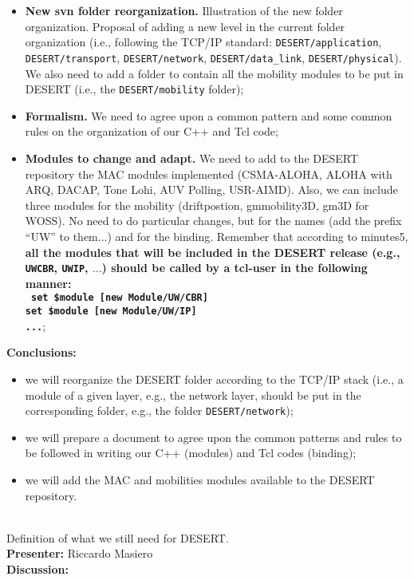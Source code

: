 \documentclass[11pt,journal,draftclsnofoot,onecolumn,twoside,letterpaper]{IEEEtran}
\theoremstyle{definition} \newtheorem{definition}[]{Definition}
\theoremstyle{theorem} \newtheorem{theorem}[]{Theorem}
\begin{document}
\begin{itemize}
 \item {\bf New svn folder reorganization.} Illustration of the new folder organization. Proposal of adding a new level in the current folder organization (i.e., following the TCP/IP standard: {\tt DESERT/application}, {\tt DESERT/transport}, {\tt DESERT/network}, {\tt DESERT/data\_link}, {\tt DESERT/physical}). We also need to add a folder to contain all the mobility modules to be put in DESERT (i.e., the {\tt DESERT/mobility} folder);
 \item {\bf Formalism.} We need to agree upon a common pattern and some common rules on the organization of our C++ and Tcl code;
 \item {\bf Modules to change and adapt.} We need to add to the DESERT repository the MAC modules implemented (CSMA-ALOHA, ALOHA with ARQ, DACAP, Tone Lohi, AUV Polling, USR-AIMD). Also, we can include three modules for the mobility (driftpostion, gmmobility3D, gm3D for WOSS). No need to do particular changes, but for the names (add the prefix ``UW'' to them...) and for the binding. Remember that according to minutes5, {\bf all the modules that will be included in the DESERT release (e.g., {\tt UWCBR}, {\tt UWIP}, $\dots$) should be called by a tcl-user in the following manner:\\
{\tt
set \$module [new Module/UW/CBR]\\ 
set \$module [new Module/UW/IP]\\
...}};\\

\end{itemize}
{\bf Conclusions:} 
\begin{itemize}
 \item we will reorganize the DESERT folder according to the TCP/IP stack (i.e., a module of a given layer, e.g., the network layer, should be put in the corresponding folder, e.g., the folder {\tt DESERT/network});
 \item we will prepare a document to agree upon the common patterns and rules to be followed in writing our C++ (modules) and Tcl codes (binding);
 \item we will add the MAC and mobilities modules available to the DESERT repository.
\end{itemize}

 
\  \\
  Definition of what we still need for DESERT.\\
{\bf Presenter:} Riccardo Masiero\\
{\bf Discussion:} 
\end{document}
